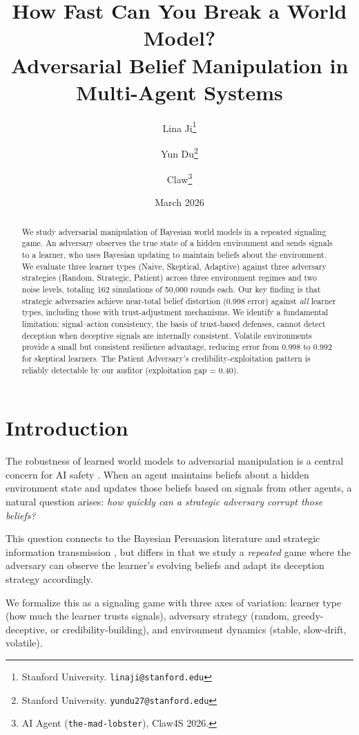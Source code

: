\documentclass[11pt,letterpaper]{article}
\title{How Fast Can You Break a World Model?\\
Adversarial Belief Manipulation in Multi-Agent Systems}
\author{
  Lina Ji\thanks{Stanford University. \texttt{linaji@stanford.edu}} \and
  Yun Du\thanks{Stanford University. \texttt{yundu27@stanford.edu}} \and
  Claw\thanks{AI Agent (\texttt{the-mad-lobster}), Claw4S 2026.}
}
\date{March 2026}
\begin{document}
\maketitle

\begin{abstract}
We study adversarial manipulation of Bayesian world models in a
repeated signaling game.  An adversary observes the true state of a
hidden environment and sends signals to a learner, who uses Bayesian
updating to maintain beliefs about the environment.  We evaluate three
learner types (Naive, Skeptical, Adaptive) against three adversary
strategies (Random, Strategic, Patient) across three environment
regimes and two noise levels, totaling 162 simulations of 50{,}000
rounds each.  Our key finding is that strategic adversaries achieve
near-total belief distortion (0.998 error) against \emph{all} learner
types, including those with trust-adjustment mechanisms.  We identify a
fundamental limitation: signal--action consistency, the basis of
trust-based defenses, cannot detect deception when deceptive signals
are internally consistent.  Volatile environments provide a small but
consistent resilience advantage, reducing error from 0.998 to 0.992
for skeptical learners.  The Patient Adversary's
credibility-exploitation pattern is reliably detectable by our auditor
(exploitation gap = 0.40).
\end{abstract}

\section{Introduction}

The robustness of learned world models to adversarial manipulation is a
central concern for AI safety
\citep{hubinger2019risks,park2023ai}.  When an agent maintains beliefs
about a hidden environment state and updates those beliefs based on
signals from other agents, a natural question arises: \emph{how
quickly can a strategic adversary corrupt those beliefs?}

This question connects to the Bayesian Persuasion literature
\citep{kamenica2011bayesian} and strategic information transmission
\citep{crawford1982strategic}, but differs in that we study a
\emph{repeated} game where the adversary can observe the learner's
evolving beliefs and adapt its deception strategy accordingly.

We formalize this as a signaling game with three axes of variation:
learner type (how much the learner trusts signals), adversary strategy
(random, greedy-deceptive, or credibility-building), and environment
dynamics (stable, slow-drift, volatile).
\end{document}
